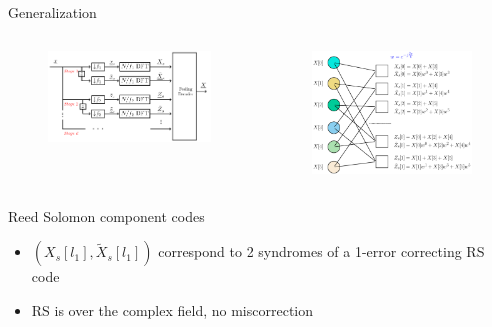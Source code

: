 \documentclass[10pt,xcolor=table]{beamer}
\begin{document}
	\begin{frame}{Generalization}
		
		
	\begin{columns}
			\begin{figure}[t]
				\centering
				\includegraphics[width=2.5in]{FFAST_2stages}
			\end{figure}
			\vspace{-6mm}
			\hspace{-1.5in}
			
			\begin{figure}[t]
				
				\includegraphics[width=2.45in]{Factorgraph_example_tilde}
			\end{figure}
			
		\end{columns}
%				
		\begin{block}{Reed Solomon component codes}
			\begin{itemize}
				\item $(X_s[l_1],\tilde{X}_s[l_1])$ correspond to 2 syndromes of a 1-error correcting RS code
                \item RS is over the complex field, no miscorrection
			\end{itemize}
		\end{block}
	\end{frame}	
\end{document}
